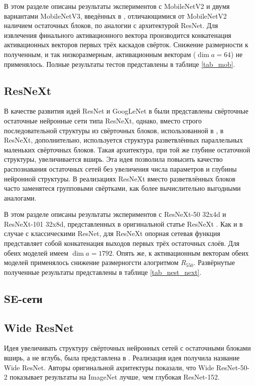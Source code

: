 \documentclass{article}
\begin{document}
\begin{large}
В этом разделе описаны результаты экспериментов с MobileNetV2 и двумя вариантами MobileNetV3, введённых в \cite{mobilenetv3}, отличающимися от MobileNetV2 наличием остаточных блоков, по аналогии с архитектурой ResNet. Для извлечения финального активационного вектора производится конкатенация активационных векторов первых трёх каскадов свёрток. Снижение размерности к полученным, и так низкоразмерным, активационным векторам ($\dim a = 64$) не применялось. Полные результаты тестов представлены в таблице \ref{tab_mob}.

\subsection{ResNeXt}

В качестве развития идей ResNet и GoogLeNet в \cite{resnext} были представлены свёрточные остаточные нейронные сети типа ResNeXt, однако, вместо строго последовательной структуры из свёрточных блоков, использованной в \cite{resnet}, в ResNeXt, дополнительно, используется структура разветвлённых параллельных маленьких свёрточных блоков. Такая архитектура, при той же глубине остаточной структуры, увеличивается вширь. Эта идея позволила повысить качество распознавания остаточных сетей без увеличения числа параметров и глубины нейронной структуры. В реализациях ResNeXt вместо разветвлённых блоков часто заменятеся групповыми свёртками, как более вычислительно выгодными аналогами. 

В этом разделе описаны результаты экспериментов с ResNeXt-50 32x4d и ResNeXt-101 32x8d, представленных в оригинальной статье ResNeXt \cite{resnext}. Как и в случае с классическими ResNet, для ResNeXt опорная сетевая функция представляет собой конкатенация выходов первых трёх остаточных слоёв. Для обеих моделей имеем $\dim a = 1792$. Опять же, к активационным векторам обеих моделей применялось снижение размерногсти алогритмом $R_550$. Развёрнутые полученные результаты представлены в таблице \ref{tab_nest_next}.

\subsection{SE-сети}
\cite{se}

\subsection{Wide ResNet}

Идея увеличивать структуру свёрточных нейронных сетей с остаточными блоками вширь, а не вглубь, была представлена в \cite{wide}. Реализация идея получила название Wide ResNet. Авторы оригинальной ахритектуры показали, что Wide ResNet-50-2 показывает результаты на ImageNet лучше, чем глубокая ResNet-152.


\end{large}
\end{document}
